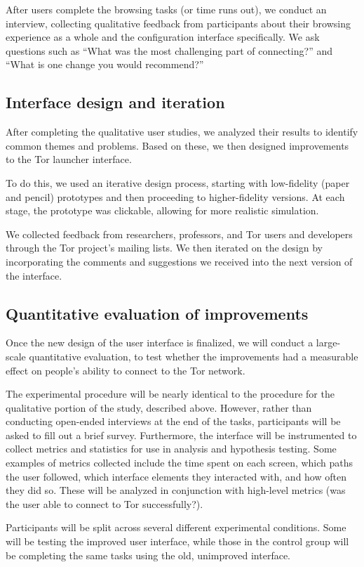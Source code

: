 \documentclass{template}
\begin{document}
After users complete the browsing tasks (or time runs out), we conduct an
interview, collecting qualitative feedback from
participants about their browsing experience as a whole
and the configuration interface specifically.
We ask questions such as
``What was the most challenging part of connecting?''
and
``What is one change you would recommend?''


\subsection{Interface design and iteration}
After completing the qualitative user studies, we analyzed their results to
identify common themes and problems. Based on these, we then designed
improvements to the Tor launcher interface.

To do this, we used an iterative design process, starting with low-fidelity
(paper and pencil) prototypes and then proceeding to higher-fidelity versions.
At each stage, the prototype was clickable, allowing for more realistic
simulation.

We collected feedback from researchers, professors, and Tor users and developers
through the Tor project's mailing lists. We then iterated on the design by
incorporating the comments and suggestions we received into the next version of
the interface.

\subsection{Quantitative evaluation of improvements}
Once the new design of the user interface is finalized, we will conduct a
large-scale quantitative evaluation, to test whether the improvements had a
measurable effect on people's ability to connect to the Tor network.

The experimental procedure will be nearly identical to the procedure for the
qualitative portion of the study, described above. However, rather than
conducting open-ended interviews at the end of the tasks, participants will be
asked to fill out a brief survey. Furthermore, the interface will be
instrumented to collect metrics and statistics for use in analysis and
hypothesis testing.
Some examples of metrics collected include the time spent on each screen, which
paths the user followed, which interface elements they interacted with, and how
often they did so. These will be analyzed in conjunction with high-level metrics
(was the user able to connect to Tor successfully?).

Participants will be split across several different experimental conditions.
Some will be testing the improved user interface, while those in the control
group will be completing the same tasks using the old, unimproved interface. \\
\end{document}
